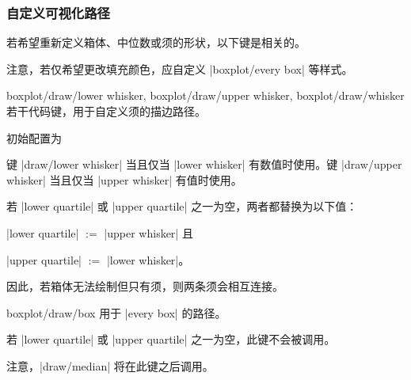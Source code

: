 \subsubsection{自定义可视化路径}

若希望重新定义箱体、中位数或须的形状，以下键是相关的。

注意，若仅希望更改填充颜色，应自定义 |boxplot/every box| 等样式。

\begin{pgfplotsxycodekeylist}{%
    boxplot/draw/lower whisker,
    boxplot/draw/upper whisker,
    boxplot/draw/whisker%
}
    若干代码键，用于自定义须的描边路径。

    初始配置为
\begin{codeexample}
\end{codeexample}

    键 |draw/lower whisker| 当且仅当 |lower whisker| 有数值时使用。键
    |draw/upper whisker| 当且仅当 |upper whisker| 有值时使用。

    若 |lower quartile| 或 |upper quartile| 之一为空，两者都替换为以下值：

    |lower quartile| $:=$ |upper whisker| 且

    |upper quartile| $:=$ |lower whisker|。

    因此，若箱体无法绘制但只有须，则两条须会相互连接。
\end{pgfplotsxycodekeylist}

\begin{pgfplotscodekey}{boxplot/draw/box}
    用于 |every box| 的路径。
\begin{codeexample}
\end{codeexample}

    若 |lower quartile| 或 |upper quartile| 之一为空，此键不会被调用。

    注意，|draw/median| 将在此键之后调用。
\end{pgfplotscodekey}

